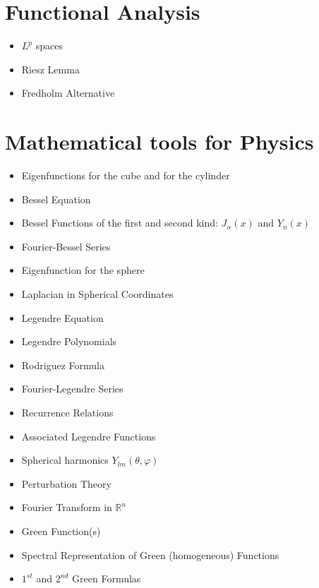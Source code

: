 \documentclass[10pt]{article}
\begin{document}
\begin{refsection}
	\nocite{do2017differential}
	\nocite{hou1997differential}
	\printbibliography[heading=subbibliography]
\end{refsection}

\section{Functional Analysis}
\begin{refsection}
\begin{itemize}
	\item $ L^p $ spaces
	\item Riesz Lemma
	\item Fredholm Alternative
\end{itemize}
\nocite{brezis2010functional}
\printbibliography[heading=subbibliography]
\end{refsection}

\section{Mathematical tools for Physics}
\begin{itemize}
	\item Eigenfunctions for the cube and for the cylinder
	\item Bessel Equation
	\item Bessel Functions of the first and second kind: $ J_{\alpha}(x) $ and $ Y_n(x) $
	\item Fourier-Bessel Series
	\item Eigenfunction for the sphere
	\item Laplacian in Spherical Coordinates
	\item Legendre Equation
	\item Legendre Polynomials
	\item Rodriguez Formula 
	\item Fourier-Legendre Series
	\item Recurrence Relations
	\item Associated Legendre Functions
	\item Spherical harmonics $ Y_{lm}(\theta,\varphi) $
	\item Perturbation Theory
	\item Fourier Transform in $\mathbb{R}^n$
	\item Green Function(s)
	\item Spectral Representation of Green (homogeneous) Functions
	\item $1^{st}$ and $2^{nd}$ Green Formulas
\end{itemize}
\end{document}
